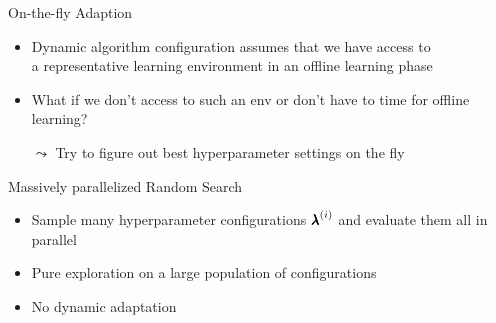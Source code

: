 	
\begin{frame}[c]{On-the-fly Adaption}

\begin{itemize}
	\item Dynamic algorithm configuration assumes that we have access to\\ a \alert{representative learning environment} in an \alert{offline learning phase}
	\pause
	\item What if we don't access to such an env or don't have to time for offline learning?
	\pause
	\bigskip
	\item[$\leadsto$] Try to figure out best hyperparameter settings on the fly
\end{itemize}

\end{frame}
\begin{frame}[c]{Massively parallelized Random Search}


\bigskip
\begin{itemize}
	\item Sample many hyperparameter configurations ${\pmb{\lambda}}^{(i)}$ and evaluate them all in parallel
	\pause
	\item Pure exploration on a large population of configurations
	\pause
	\item No dynamic adaptation
\end{itemize}

\end{frame}
